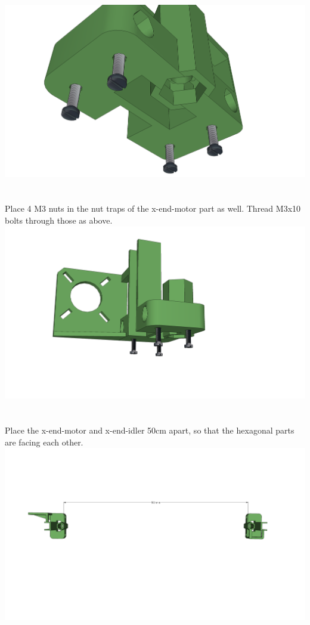 \documentclass[twoside,a4paper,titlepage]{memoir}
\begin{document}
	\includegraphics[width=1\linewidth]{graphics/ch7_3_4.png}
	
	\section{}
	Place 4 M3 nuts in the nut traps of the x-end-motor part as well. Thread M3x10 bolts through those as
	above.\\
	\includegraphics[width=1\linewidth]{graphics/ch7_4.png}
	
	\section{}
	Place the x-end-motor and x-end-idler 50cm apart, so that the hexagonal parts are facing each other.\\
	\includegraphics[width=1\linewidth]{graphics/ch7_5.png}
	
\end{document}
